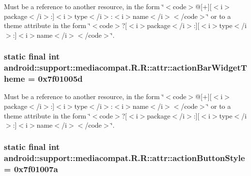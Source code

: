 Must be a reference to another resource, in the form \char`\"{}$<$code$>$@\mbox{[}+\mbox{]}\mbox{[}$<$i$>$package$<$/i$>$:\mbox{]}$<$i$>$type$<$/i$>$:$<$i$>$name$<$/i$>$$<$/code$>$\char`\"{} or to a theme attribute in the form \char`\"{}$<$code$>$?\mbox{[}$<$i$>$package$<$/i$>$:\mbox{]}\mbox{[}$<$i$>$type$<$/i$>$:\mbox{]}$<$i$>$name$<$/i$>$$<$/code$>$\char`\"{}. \hypertarget{classandroid_1_1support_1_1mediacompat_1_1_r_1_1attr_ade93b903977b7ad5f72b7ea18000a71}{
\subsubsection[{actionBarWidgetTheme}]{\setlength{\rightskip}{0pt plus 5cm}static final int android::support::mediacompat.R.R::attr::actionBarWidgetTheme = 0x7f01005d}}
\label{classandroid_1_1support_1_1mediacompat_1_1_r_1_1attr_ade93b903977b7ad5f72b7ea18000a71}


Must be a reference to another resource, in the form \char`\"{}$<$code$>$@\mbox{[}+\mbox{]}\mbox{[}$<$i$>$package$<$/i$>$:\mbox{]}$<$i$>$type$<$/i$>$:$<$i$>$name$<$/i$>$$<$/code$>$\char`\"{} or to a theme attribute in the form \char`\"{}$<$code$>$?\mbox{[}$<$i$>$package$<$/i$>$:\mbox{]}\mbox{[}$<$i$>$type$<$/i$>$:\mbox{]}$<$i$>$name$<$/i$>$$<$/code$>$\char`\"{}. \hypertarget{classandroid_1_1support_1_1mediacompat_1_1_r_1_1attr_05a7c31e175cf9b46745a2fffc95c6d8}{
\subsubsection[{actionButtonStyle}]{\setlength{\rightskip}{0pt plus 5cm}static final int android::support::mediacompat.R.R::attr::actionButtonStyle = 0x7f01007a}}
\label{classandroid_1_1support_1_1mediacompat_1_1_r_1_1attr_05a7c31e175cf9b46745a2fffc95c6d8}


